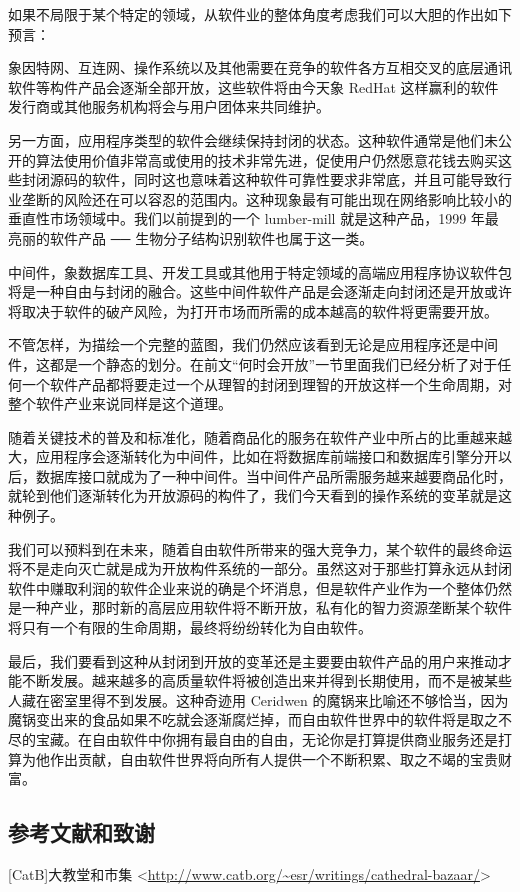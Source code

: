如果不局限于某个特定的领域，从软件业的整体角度考虑我们可以大胆的作出如下预言：


象因特网、互连网、操作系统以及其他需要在竞争的软件各方互相交叉的底层通讯软件等构件产品会逐渐全部开放，这些软件将由今天象 RedHat 这样赢利的软件发行商或其他服务机构将会与用户团体来共同维护。


另一方面，应用程序类型的软件会继续保持封闭的状态。这种软件通常是他们未公开的算法使用价值非常高或使用的技术非常先进，促使用户仍然愿意花钱去购买这些封闭源码的软件，同时这也意味着这种软件可靠性要求非常底，并且可能导致行业垄断的风险还在可以容忍的范围内。这种现象最有可能出现在网络影响比较小的垂直性市场领域中。我们以前提到的一个 lumber-mill 就是这种产品，1999 年最亮丽的软件产品 ── 生物分子结构识别软件也属于这一类。


中间件，象数据库工具、开发工具或其他用于特定领域的高端应用程序协议软件包将是一种自由与封闭的融合。这些中间件软件产品是会逐渐走向封闭还是开放或许将取决于软件的破产风险，为打开市场而所需的成本越高的软件将更需要开放。


不管怎样，为描绘一个完整的蓝图，我们仍然应该看到无论是应用程序还是中间件，这都是一个静态的划分。在前文“何时会开放”一节里面我们已经分析了对于任何一个软件产品都将要走过一个从理智的封闭到理智的开放这样一个生命周期，对整个软件产业来说同样是这个道理。


随着关键技术的普及和标准化，随着商品化的服务在软件产业中所占的比重越来越大，应用程序会逐渐转化为中间件，比如在将数据库前端接口和数据库引擎分开以后，数据库接口就成为了一种中间件。当中间件产品所需服务越来越要商品化时，就轮到他们逐渐转化为开放源码的构件了，我们今天看到的操作系统的变革就是这种例子。


我们可以预料到在未来，随着自由软件所带来的强大竞争力，某个软件的最终命运将不是走向灭亡就是成为开放构件系统的一部分。虽然这对于那些打算永远从封闭软件中赚取利润的软件企业来说的确是个坏消息，但是软件产业作为一个整体仍然是一种产业，那时新的高层应用软件将不断开放，私有化的智力资源垄断某个软件将只有一个有限的生命周期，最终将纷纷转化为自由软件。


最后，我们要看到这种从封闭到开放的变革还是主要要由软件产品的用户来推动才能不断发展。越来越多的高质量软件将被创造出来并得到长期使用，而不是被某些人藏在密室里得不到发展。这种奇迹用 Ceridwen 的魔锅来比喻还不够恰当，因为魔锅变出来的食品如果不吃就会逐渐腐烂掉，而自由软件世界中的软件将是取之不尽的宝藏。在自由软件中你拥有最自由的自由，无论你是打算提供商业服务还是打算为他作出贡献，自由软件世界将向所有人提供一个不断积累、取之不竭的宝贵财富。

\subsection{参考文献和致谢}
[CatB]大教堂和市集 <\url{http://www.catb.org/~esr/writings/cathedral-bazaar/}>


